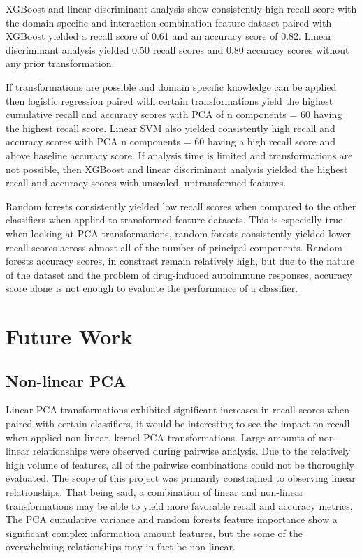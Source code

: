 \documentclass{article}
\begin{document}
\begin{itemize}
XGBoost and linear discriminant analysis show consistently high recall score with the domain-specific and interaction combination feature dataset paired with XGBoost yielded a recall score of 0.61 and an accuracy score of 0.82. Linear discriminant analysis yielded 0.50 recall scores and 0.80 accuracy scores without any prior transformation.\newline

If transformations are possible and domain specific knowledge can be applied then logistic regression paired with certain transformations yield the highest cumulative recall and accuracy scores with PCA of n components = 60 having the highest recall score. Linear SVM also yielded consistently high recall and accuracy scores with PCA n components = 60 having a high recall score and above baseline accuracy score. If analysis time is limited and transformations are not possible, then XGBoost and linear discriminant analysis yielded the highest recall and accuracy scores with unscaled, untransformed features. \newline

Random forests consistently yielded low recall scores when compared to the other classifiers when applied to transformed feature datasets. This is especially true when looking at PCA transformations, random forests consistently yielded lower recall scores across almost all of the number of principal components. Random forests accuracy scores, in constrast remain relatively high, but due to the nature of the dataset and the problem of drug-induced autoimmune responses, accuracy score alone is not enough to evaluate the performance of a classifier. 

\section{Future Work}

\subsection{Non-linear PCA}
Linear PCA transformations exhibited significant increases in recall scores when paired with certain classifiers, it would be interesting to see the impact on recall when applied non-linear, kernel PCA transformations. Large amounts of non-linear relationships were observed during pairwise analysis. Due to the relatively high volume of features, all of the pairwise combinations could not be thoroughly evaluated. The scope of this project was primarily constrained to observing linear relationships. That being said, a combination of linear and non-linear transformations may be able to yield more favorable recall and accuracy metrics. The PCA cumulative variance and random forests feature importance show a significant complex information amount features, but the some of the overwhelming relationships may in fact be non-linear. 


\end{itemize}
\end{document}
